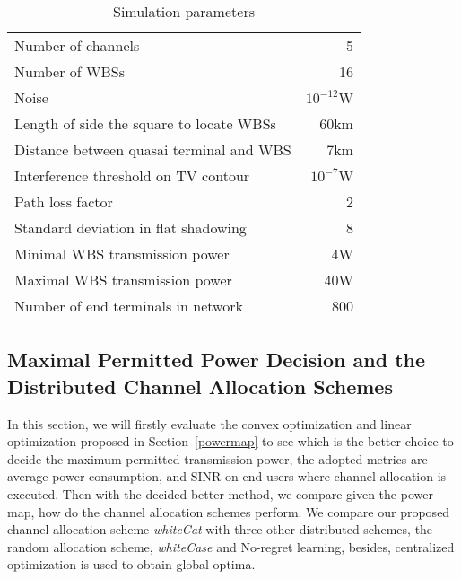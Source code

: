 \begin{table}[!h]
\centering
\begin{tabular}{|l|r|}
  \hline
  Number of channels 						& 5 \\
  Number of WBSs							& 16\\
  Noise 									& $10^{-12}$W \\ %
  Length of side the square to locate WBSs		& 60km\\
  Distance between quasai terminal and WBS 	& 7km \\
  Interference threshold on TV contour 		& $10^{-7}$W \\ %
  Path loss factor 							& 2 \\
  Standard deviation in flat shadowing		& 8\\
  Minimal WBS transmission power~\footnotemark{} 			& 4W \\
  Maximal WBS transmission power 			& 40W \\
  Number of end terminals in network 		& 800 \\
  \hline
\end{tabular}
\caption{Simulation parameters}
\label{simulationparameter}
\end{table}

\subsection{Maximal Permitted Power Decision and the Distributed Channel Allocation Schemes}
\label{MaxPower_whitecat}
In this section, we will firstly evaluate the convex optimization and linear optimization proposed in Section~\ref{powermap} to see which is the better choice to decide the maximum permitted transmission power, the adopted metrics are average power consumption, and SINR on end users where channel allocation is executed.
Then with the decided better method, we compare given the power map, how do the channel allocation schemes perform.
We compare our proposed channel allocation scheme \textit{whiteCat} with three other distributed schemes, the random allocation scheme, \textit{whiteCase} and No-regret learning, besides, centralized optimization is used to obtain global optima.

